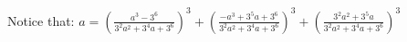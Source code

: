 \documentclass[preview]{standalone}
\begin{document}
\begin{center}
Notice that: $a = \left( \frac{a^3 - 3^6}{3^2a^2 + 3^4a + 3^6} \right)^3 + \left( \frac{-a^3 + 3^5a + 3^6}{3^2a^2 + 3^4a + 3^6} \right)^3 + \left( \frac{3^2a^2 + 3^5a}{3^2a^2 + 3^4a + 3^6} \right)^3$
\end{center}
\end{document}
